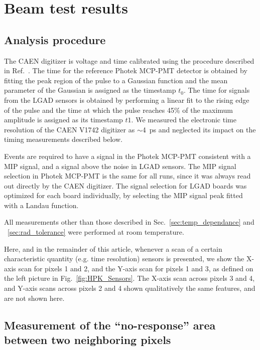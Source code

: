 \documentclass[preprint,1p]{elsarticle}
\begin{document}


\section{Beam test results}
\label{sec:results}

\subsection{Analysis procedure}

The CAEN digitizer is voltage and time calibrated using the procedure described
in Ref.~\cite{Kim201467}. The time for the reference Photek MCP-PMT detector is
obtained by fitting the peak region of the pulse to a Gaussian function and the
mean parameter of the Gaussian is assigned as the timestamp $t_0$. The time for
signals from the LGAD sensors is obtained by performing a linear fit to the
rising edge of the pulse and the time at which the pulse reaches 45\% of the
maximum amplitude is assigned as its timestamp $t1$. We measured the electronic
time resolution of the CAEN V1742 digitizer as $\sim$4~ps and neglected its
impact on the timing measurements described below. 

Events are required to have a signal in the Photek MCP-PMT consistent with a MIP
signal, and a signal above the noise in LGAD sensors. The MIP signal selection
in Photek MCP-PMT is the same for all runs, since it was always read out
directly by the CAEN digitizer. The signal selection for LGAD boards was
optimized for each board individually, by selecting the MIP signal peak fitted
with a Landau function. 

All measurements other than those described in Sec.~\ref{sec:temp_dependance}
and ~\ref{sec:rad_tolerance} were performed at room temperature. 

Here, and in the remainder of this article, whenever a scan of a certain
characteristic quantity (e.g. time resolution) sensors is presented, we show the
X-axis scan for pixels 1 and 2, and the Y-axis scan for pixels 1 and 3, as
defined on the left picture in Fig.~\ref{fig:HPK_Sensors}. The X-axis scan
across pixels 3 and 4, and Y-axis scans across pixels 2 and 4 shown
qualitatively the same features, and are not shown here. 


\subsection{Measurement of the ``no-response'' area between two neighboring pixels}
\label{sec:HPK_50D_gap}
\end{document}
